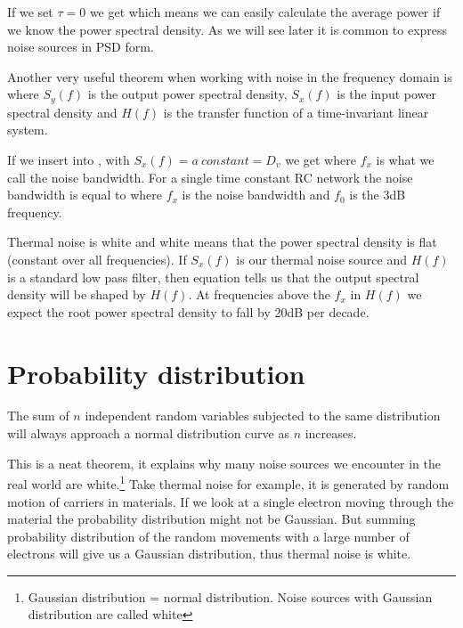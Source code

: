 If we set $\tau=0$ we get
which means we can easily calculate the average power if we know the
power spectral density.
As we will see later it is common to express noise sources in PSD
form. 

Another very useful theorem when working with noise in the frequency
domain is
where $S_y(f)$ is the output power spectral density, $S_x(f)$ is the
input power spectral density and $H(f)$ is the transfer function of
a time-invariant linear system. 

If we insert  into  , with $S_x(f) =
a\:constant = D_v$
we get
where $f_x$ is what we call the noise bandwidth. For a single
time constant RC network the noise bandwidth is equal to
where $f_x$ is the noise bandwidth and $f_0$ is the 3dB frequency.

Thermal noise is white and white
means that the power spectral density is flat (constant over all
frequencies).  If $S_x(f)$ is our thermal noise source
and $H(f)$ is a standard low pass filter, then equation  tells
us that the output spectral density will be shaped by $H(f)$. At
frequencies above the $f_x$ in $H(f)$ we expect the root power spectral
density to fall by 20dB per decade. 


\section{Probability distribution}

\begin{theorem}
The sum of $n$ independent random variables subjected to the same
distribution will always approach a normal distribution curve as $n$ increases.
\end{theorem}

This is a neat theorem, it explains why many noise sources we
encounter in the real world are white.\footnote{Gaussian distribution
  = normal distribution. Noise sources with Gaussian distribution are
  called white} Take thermal noise for example,
it is generated by random motion of carriers in materials. If we look
at a single electron moving through the material the probability
distribution might not be Gaussian. But summing probability
distribution of the random movements with
a large number of electrons will give us a Gaussian distribution, thus
thermal noise is white.

